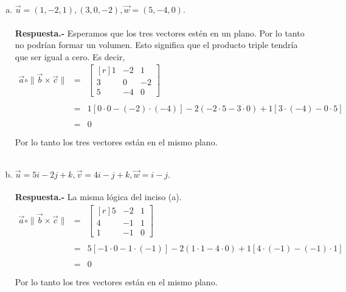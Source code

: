 \begin{enumerate}
\begin{enumerate}[(a)]
	\item \textbf{\boldmath $\vec{u}=(1,-2,1),(3,0,-2),\vec{w}=(5,-4,0).$\\\\
	    Respuesta.-}\; Esperamos que los tres vectores estén en un plano. Por lo tanto no podrían formar un volumen. Esto significa que el producto triple tendría que ser igual a cero. Es decir,
	    $$\begin{array}{rcl}
		\vec{a}\circ \| \vec{b} \times \vec{c} \|&=&\begin{bmatrix*}[r]
		1 & -2 & 1\\
		3 & 0 & -2\\
		5 & -4 & 0
	    \end{bmatrix*}\\\\
							 &=&1\left[0\cdot 0 - (-2)\cdot (-4)\right]-2(-2\cdot 5-3\cdot 0)+1\left[3\cdot (-4)-0\cdot 5\right]\\\\
							 &=&0\\\\
	    \end{array}$$
	    Por lo tanto los tres vectores están en el mismo plano.\\\\

	\item \textbf{\boldmath $\vec{u} = 5i-2j+k,\vec{v}=4i-j+k,\vec{w}=i-j.$\\\\
	    Respuesta.-}\; La misma lógica del inciso (a).
	    $$\begin{array}{rcl}
		\vec{a}\circ \| \vec{b} \times \vec{c} \|&=&\begin{bmatrix*}[r]
		5 & -2 & 1\\
		4 & -1 & 1\\
		1 & -1 & 0
	    \end{bmatrix*}\\\\
	    							 &=&5\left[-1\cdot 0 - 1\cdot (-1)\right]-2(1\cdot 1-4\cdot 0)+1\left[4\cdot (-1)-(-1)\cdot 1\right]\\\\
							 &=&0\\\\
	    \end{array}$$
	    Por lo tanto los tres vectores están en el mismo plano.\\\\

    \end{enumerate}


\end{enumerate}
